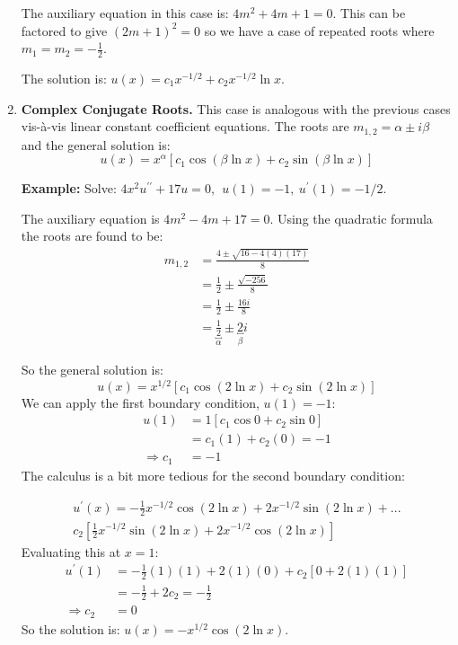 \begin{enumerate}
\vspace{0.25cm}

\noindent The auxiliary equation in this case is: $4m^2+4m+1=0$.  This can be factored to give $(2m+1)^2=0$ so we have a case of repeated roots where $m_1=m_2=-\frac{1}{2}$.

The solution is: $u(x)=c_1x^{-1/2}+c_2x^{-1/2}\ln{x}$.

\vspace{0.5cm}

\item \textbf{Complex Conjugate Roots.}  This case is analogous with the previous cases vis-\`a-vis linear constant coefficient equations.  The roots are $m_{1,2} = \alpha \pm i\beta$ and the general solution is:
\begin{equation}
u(x) = x^{\alpha}\left[c_1 \cos{(\beta \ln{x})} + c_2 \sin{(\beta \ln{x})} \right]
\end{equation}

\vspace{0.5cm}

\noindent\textbf{Example:} Solve: $4x^2 u^{\prime \prime} +17u=0, \ \ u(1)=-1, \ u^{\prime}(1)=-1/2$.

\vspace{0.25cm}

\noindent The auxiliary equation is $4m^2-4m+17=0$.  Using the quadratic formula the roots are found to be: 
\begin{align*}
m_{1,2} &= \frac{4 \pm \sqrt{16-4(4)(17)}}{8} \\
&=\frac{1}{2} \pm \frac{\sqrt{-256}}{8} \\
&=\frac{1}{2} \pm \frac{16i}{8} \\
&=\underbracket{\frac{1}{2}}_{\alpha} \pm \underbracket{2}_{\beta}i
\end{align*}

\noindent So the general solution is:
\begin{equation*}
u(x)=x^{1/2}\left[c_1 \cos{(2 \ln{x})}+c_2 \sin{(2 \ln{x})} \right]
\end{equation*}
We can apply the first boundary condition, $u(1)=-1$:
\begin{align*}
u(1) &= 1 \left[c_1 \cos{0} + c_2 \sin{0} \right] \\
&= c_1(1) + c_2(0) = -1 \\
\Rightarrow c_1&=-1
\end{align*}
The calculus is a bit more tedious for the second boundary condition:

\begin{multline*}
u^{\prime}(x) = -\frac{1}{2}x^{-1/2}\cos{(2 \ln{x})} + 2x^{-1/2}\sin{(2 \ln{x})} + ...\\
c_2\left[ \frac{1}{2} x^{-1/2} \sin{(2 \ln{x})} + 2x^{-1/2}\cos{(2 \ln{x})} \right]
\end{multline*}
Evaluating this at $x=1$:
\begin{align*}
u^{\prime}(1)&=-\frac{1}{2}(1)(1)+2(1)(0)+c_2[0+2(1)(1)] \\
&=-\frac{1}{2}+2c_2 = -\frac{1}{2} \\
\Rightarrow c_2&=0
\end{align*}
So the solution is: $u(x) = -x^{1/2}\cos{(2 \ln{x})}$.


\end{enumerate}
